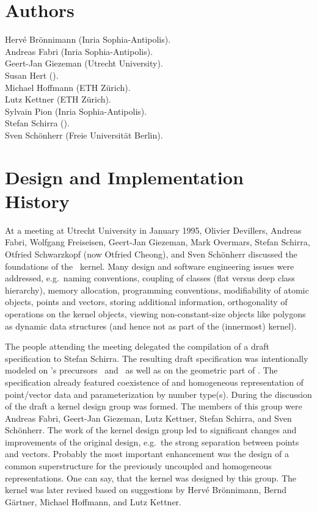 \section*{Authors}

Herv\'e Br\"onnimann ({\sc Inria} Sophia-Antipolis). \\
Andreas Fabri ({\sc Inria} Sophia-Antipolis).\\
Geert-Jan Giezeman (Utrecht University).\\
Susan Hert ().\\
Michael Hoffmann (ETH Z\"urich).\\
Lutz Kettner (ETH Z\"urich).\\
Sylvain Pion ({\sc Inria} Sophia-Antipolis). \\
Stefan Schirra ().\\
Sven Sch\"onherr (Freie Universit{\"a}t Berlin).

\section*{Design and Implementation History}

At a meeting at Utrecht University in January 1995,
Olivier Devillers, Andreas Fabri, Wolfgang Freiseisen,
Geert-Jan Giezeman, Mark Overmars, Stefan Schirra, Otfried Schwarzkopf
(now Otfried Cheong), and Sven Sch\"onherr
discussed the foundations of the \cgal\ kernel.
Many design and software engineering issues were addressed, 
e.g.\ naming conventions, coupling of classes 
(flat versus deep class hierarchy), 
memory allocation, programming conventions, modifiability of 
atomic objects, points and vectors, storing additional information, 
orthogonality of operations on the kernel objects,
viewing non-constant-size objects like polygons as 
dynamic data structures (and hence not as part of the (innermost) kernel).

The people attending the meeting delegated the compilation of 
a draft specification to Stefan Schirra.
The resulting draft specification was intentionally modeled on \cgal's 
precursors \protocgal\ and \plageo\ as well as on the geometric part of \leda.
The specification already featured coexistence of 
 and 
homogeneous representation of point/vector data and parameterization 
by number type(s).
During the discussion of the draft a kernel design group was formed. 
The members of this group were Andreas Fabri, Geert-Jan Giezeman,
Lutz Kettner, Stefan Schirra, and Sven Sch\"onherr.
The work of the kernel design group led to significant changes and
improvements of the original design, e.g.\ the strong separation between
points and vectors. Probably the most important enhancement was the design 
of a common superstructure for the previously uncoupled 
 and
homogeneous representations. One can say, that the kernel was designed
by this group.
The kernel was later revised based on suggestions by Herv\'e Br\"onnimann,
Bernd G\"artner, Michael Hoffmann, and Lutz Kettner.


